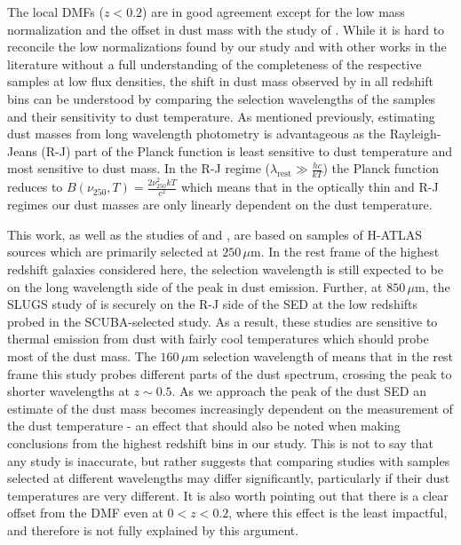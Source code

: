 The local DMFs ($z < 0.2$) are in good agreement except for the low mass normalization and the offset in dust mass with the study of \citealt{Pozzi_2020}. While it is hard to reconcile the low normalizations found by our study and \citealt{Dunne_2011} with other works in the literature without a full understanding of the completeness of the respective samples at low flux densities, the shift in dust mass observed by \citealt{Pozzi_2020} in all redshift bins can be understood by comparing the selection wavelengths of the samples and their sensitivity to dust temperature. As mentioned previously, estimating dust masses from long wavelength photometry is advantageous as the Rayleigh-Jeans (R-J) part of the Planck function is least sensitive to dust temperature and most sensitive to dust mass. In the R-J regime ($\lambda_{\textrm{rest}} \gg \frac{hc}{kT}$) the Planck function reduces to $B(\nu_{250}, T) = \frac{2\nu_{250}^{2}kT}{c^2}$ which means that in the optically thin and R-J regimes our dust masses are only linearly dependent on the dust temperature.

This work, as well as the studies of \citealt{Dunne_2011} and \citealt{Beeston_2018}, are based on samples of H-ATLAS sources which are primarily selected at $250\,\mu$m. In the rest frame of the highest redshift galaxies considered here, the selection wavelength is still expected to be on the long wavelength side of the peak in dust emission. Further, at $850\,\mu$m, the SLUGS study of \citealt{Vlahakis_2005} is securely on the R-J side of the SED at the low redshifts probed in the SCUBA-selected study. As a result, these studies are sensitive to thermal emission from dust with fairly cool temperatures which should probe most of the dust mass. The $160\,\mu$m selection wavelength of \citealt{Pozzi_2020} means that in the rest frame this study probes different parts of the dust spectrum, crossing the peak to shorter wavelengths at $z \sim 0.5$. As we approach the peak of the dust SED an estimate of the dust mass becomes increasingly dependent on the measurement of the dust temperature - an effect that should also be noted when making conclusions from the highest redshift bins in our study. This is not to say that any study is inaccurate, but rather suggests that comparing studies with samples selected at different wavelengths may differ significantly, particularly if their dust temperatures are very different. It is also worth pointing out that there is a clear offset from the \citealt{Pozzi_2020} DMF even at $0 < z < 0.2$, where this effect is the least impactful, and therefore is not fully explained by this argument.

